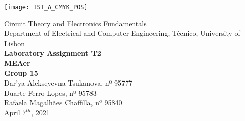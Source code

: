
\thispagestyle {empty}

\texttt{[image: IST\_A\_CMYK\_POS]}

\begin{center}
%
\vspace{1.0cm}

\vspace{1cm}
{\FontLb Circuit Theory and Electronics Fundamentals} \\ %
\vspace{1cm}
{\FontSn Department of Electrical and Computer Engineering, Técnico, University of Lisbon} \\ %
\vspace{1cm}
{\FontSn \textbf{Laboratory Assignment T2}} \\
\vspace{1cm}
{\FontSn \textbf{MEAer}} \\ %
\vspace{1cm}
{\FontSn \textbf{Group 15}} \\
\vspace{.5cm}
{\FontSn Dar'ya Alekseyevna Tsukanova, nº 95777} \\
{\FontSn Duarte Ferro Lopes, nº 95783} \\
{\FontSn Rafaela Magalhães Chaffilla, nº 95840} \\
\vspace{1cm}
{\FontSn April $7^{th}$, 2021} \\ %
%
\end{center}


